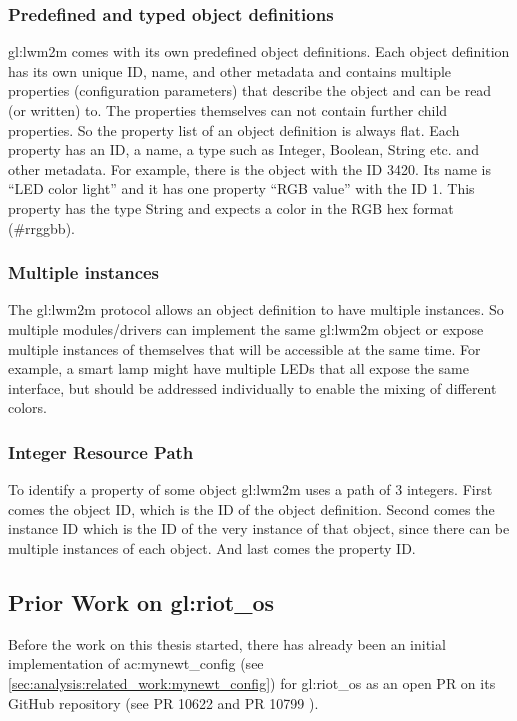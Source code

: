 \subsubsection{Predefined and typed object definitions}

\gls{gl:lwm2m} comes with its own predefined object definitions.
Each object definition has its own unique ID, name, and other metadata and contains multiple properties (configuration parameters) that describe the object and can be read (or written) to.
The properties themselves can not contain further child properties.
So the property list of an object definition is always flat.
Each property has an ID, a name, a type such as Integer, Boolean, String etc. and other metadata.
For example, there is the object with the ID 3420.
Its name is ``LED color light'' and it has one property ``RGB value'' with the ID 1.
This property has the type String and expects a color in the RGB hex format (\#rrggbb).

\subsubsection{Multiple instances}

The \gls{gl:lwm2m} protocol allows an object definition to have multiple instances.
So multiple modules/drivers can implement the same \gls{gl:lwm2m} object or expose multiple instances of themselves that will be accessible at the same time.
For example, a smart lamp might have multiple LEDs that all expose the same interface, but should be addressed individually to enable the mixing of different colors.

\subsubsection{Integer Resource Path}

To identify a property of some object \gls{gl:lwm2m} uses a path of 3 integers.
First comes the object ID, which is the ID of the object definition.
Second comes the instance ID which is the ID of the very instance of that object, since there can be multiple instances of each object.
And last comes the property ID.

\subsection{Prior Work on \gls*{gl:riot_os}}

Before the work on this thesis started, there has already been an initial implementation of \gls{ac:mynewt_config} (see \autoref{sec:analysis:related_work:mynewt_config}) for \gls{gl:riot_os} as an open PR on its GitHub repository (see PR 10622 \cite{riot_pr_10622} and PR 10799 \cite{riot_pr_10799}).

